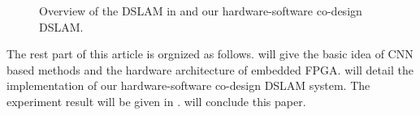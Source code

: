 \begin{figure}[thb]
    \begin{minipage}[t]{0.5\linewidth}  
    \centering
    \end{minipage}
    \begin{minipage}[t]{0.5\linewidth}  
    \centering  
    \end{minipage}
    \caption{Overview of the DSLAM in \cite{Cieslewski:20187ee} and our hardware-software co-design DSLAM.}
    \label{fig:impl}
    \end{figure}

The rest part of this article is orgnized as follows.  will give the basic idea of CNN based methods and the hardware architecture of embedded FPGA.  will detail the implementation of our hardware-software co-design DSLAM system. The experiment result will be given in .  will conclude this paper.